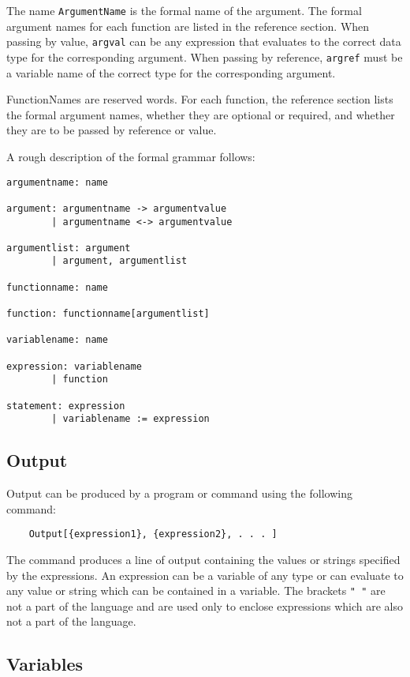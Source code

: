 The name \verb+ArgumentName+ is the formal name of the argument.  The
formal argument names for each function are listed in the reference
section.  When passing by value, \verb+argval+ can be any
expression that evaluates to the correct data type for the
corresponding argument.  When passing by reference, \verb+argref+
must be a variable name of the correct type for the corresponding
argument. 

FunctionNames are reserved words.  For each function, the reference section
lists the formal argument names, whether they are optional or required,
and whether they are to be passed by reference or value.  
 
A rough description of the formal grammar follows:

\begin{verbatim}
argumentname: name

argument: argumentname -> argumentvalue
        | argumentname <-> argumentvalue

argumentlist: argument
        | argument, argumentlist

functionname: name

function: functionname[argumentlist]

variablename: name

expression: variablename
        | function

statement: expression
        | variablename := expression
\end{verbatim}


\subsection{Output}

Output can be produced by a program or command using the following
command:

\begin{verbatim}
	Output[{expression1}, {expression2}, . . . ]
\end{verbatim}

The command produces a line of output containing the values or strings
specified by the expressions.  An expression can be a variable of any
type or can evaluate to any value or string which can be contained in
a variable.  The brackets {\tt "{ }"} are not a part of the language
and are used only to enclose expressions which are also not a part of
the language.

\subsection{Variables}

